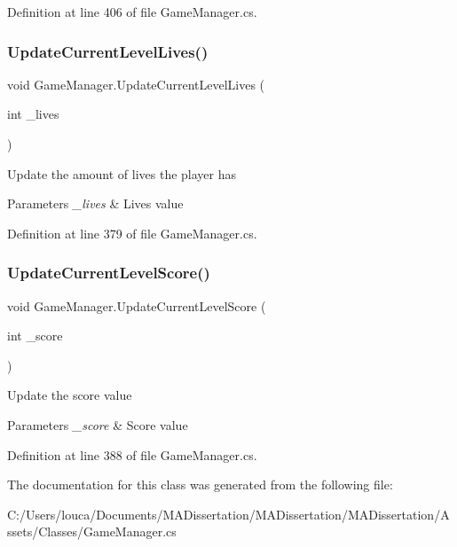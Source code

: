 Definition at line 406 of file Game\+Manager.\+cs.

\mbox{\label{class_game_manager_a66796650182ecf1f1dc98c8ee889d1a0}} 
\subsubsection{\texorpdfstring{Update\+Current\+Level\+Lives()}{UpdateCurrentLevelLives()}}
{\footnotesize\ttfamily void Game\+Manager.\+Update\+Current\+Level\+Lives (\begin{DoxyParamCaption}\item[{int}]{\+\_\+lives }\end{DoxyParamCaption})}



Update the amount of lives the player has 


\begin{DoxyParams}{Parameters}
{\em \+\_\+lives} & Lives value\\
\hline
\end{DoxyParams}


Definition at line 379 of file Game\+Manager.\+cs.

\mbox{\label{class_game_manager_ae77f42a6ee1bb7d5192709d24cf6ed34}} 
\subsubsection{\texorpdfstring{Update\+Current\+Level\+Score()}{UpdateCurrentLevelScore()}}
{\footnotesize\ttfamily void Game\+Manager.\+Update\+Current\+Level\+Score (\begin{DoxyParamCaption}\item[{int}]{\+\_\+score }\end{DoxyParamCaption})}



Update the score value 


\begin{DoxyParams}{Parameters}
{\em \+\_\+score} & Score value\\
\hline
\end{DoxyParams}


Definition at line 388 of file Game\+Manager.\+cs.



The documentation for this class was generated from the following file\+:\begin{DoxyCompactItemize}
\item 
C\+:/\+Users/louca/\+Documents/\+M\+A\+Dissertation/\+M\+A\+Dissertation/\+M\+A\+Dissertation/\+Assets/\+Classes/Game\+Manager.\+cs\end{DoxyCompactItemize}
